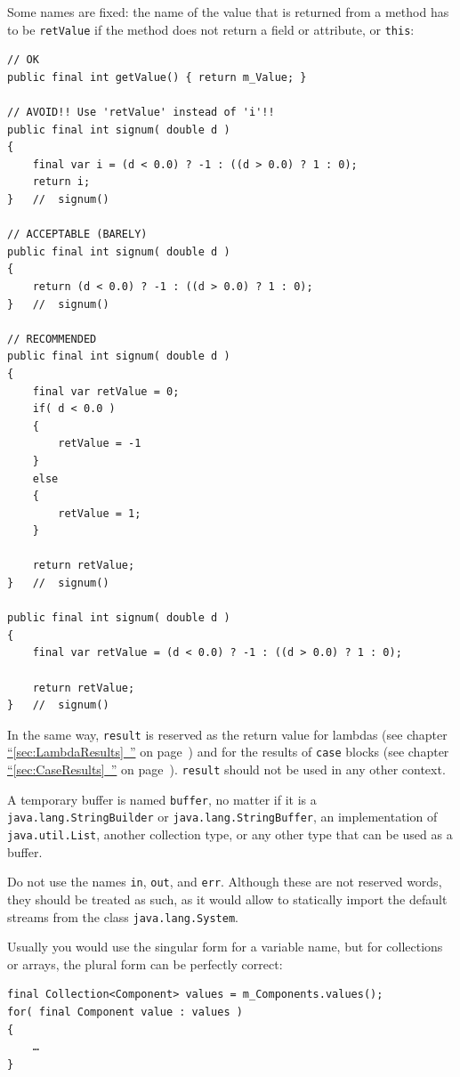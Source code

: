 \documentclass[11pt,a4paper, titlepage, parskip=half, headsepline, footsepline, cleardoublepage=current, headheight=1cm]{scrbook}
\newcommand*{\tqfullvref}[1]{\hyperref[{#1}]{“\ref*{#1}~\nameref*{#1}”} on page~\pageref{#1}}
\begin{document}
Some names are fixed: the name of the value that is returned from a method has to be \lstinline|retValue| if the method does not return a field or attribute, or \lstinline|this|:
\begin{lstlisting}
// OK
public final int getValue() { return m_Value; }

// AVOID!! Use 'retValue' instead of 'i'!!
public final int signum( double d )
{
    final var i = (d < 0.0) ? -1 : ((d > 0.0) ? 1 : 0);
    return i;
}   //  signum()

// ACCEPTABLE (BARELY)
public final int signum( double d )
{
    return (d < 0.0) ? -1 : ((d > 0.0) ? 1 : 0);
}   //  signum()

// RECOMMENDED
public final int signum( double d )
{
    final var retValue = 0;
    if( d < 0.0 )
    {
        retValue = -1
    }
    else
    {
        retValue = 1;
    }

    return retValue;
}   //  signum()

public final int signum( double d )
{
    final var retValue = (d < 0.0) ? -1 : ((d > 0.0) ? 1 : 0);

    return retValue;
}   //  signum()
\end{lstlisting}

In the same way, \lstinline|result| is reserved as the return value for lambdas (see chapter \tqfullvref{sec:LambdaResults}) and for the results of \lstinline|case| blocks (see chapter \tqfullvref{sec:CaseResults}). \lstinline|result| should not be used in any other context.

A temporary buffer is named \lstinline|buffer|, no matter if it is a \lstinline|java.lang.StringBuilder| or \lstinline|java.lang.StringBuffer|, an implementation of \lstinline|java.util.List|, another collection type, or any other type that can be used as a buffer.

Do not use the names \lstinline|in|, \lstinline|out|, and \lstinline|err|. Although these are not reserved words, they should be treated as such, as it would allow to statically import the default streams from the class \lstinline|java.lang.System|.

Usually you would use the singular form for a variable name, but for collections or arrays, the plural form can be perfectly correct:
\begin{lstlisting}
final Collection<Component> values = m_Components.values();
for( final Component value : values )
{
    …
}    
\end{lstlisting}
\end{document}
